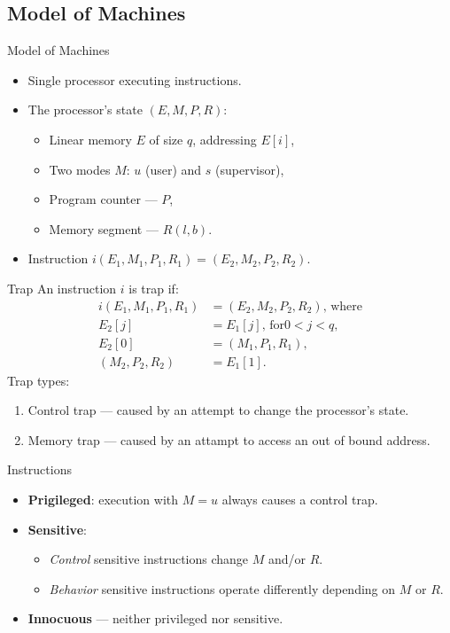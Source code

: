 \subsection{Model of Machines}

\begin{frame}{Model of Machines}
\begin{itemize}
\item Single processor executing instructions.
\item The processor's state $(E, M, P, R)$:
  \begin{itemize}
  \item Linear memory $E$ of size $q$, addressing $E[i]$,
  \item Two modes $M$: $u$ (user) and $s$ (supervisor),
  \item Program counter --- $P$,
  \item Memory segment --- $R (l, b)$.
  \end{itemize}
\item Instruction $i(E_1, M_1, P_1, R_1) = (E_2, M_2, P_2, R_2)$.
\end{itemize}
\end{frame}

\begin{frame}{Trap}
An instruction $i$ is trap if:
\begin{equation*}
  \begin{aligned}
  i(E_1, M_1, P_1, R_1) &= (E_2, M_2, P_2, R_2)\text{, where} \\
  E_2[j] &= E_1[j]\text{, for} 0 < j < q, \\
  E_2[0] &= (M_1, P_1, R_1), \\
  (M_2, P_2, R_2) &= E_1[1].
  \end{aligned}
\end{equation*}
\pause\vfill
Trap types:
\begin{enumerate}
\item Control trap --- caused by an attempt to change the processor's state.
\item Memory trap --- caused by an attampt to access an out of bound address.
\end{enumerate}
\end{frame}

\begin{frame}{Instructions}
\begin{itemize}
\item \textbf{Prigileged}: execution with $M=u$ always causes a
  control trap.\pause
\item \textbf{Sensitive}:
  \begin{itemize}
  \item \textit{Control} sensitive instructions change $M$ and/or $R$.
  \item \textit{Behavior} sensitive instructions operate differently depending
    on $M$ or $R$.\pause
  \end{itemize}
  \item \textbf{Innocuous} --- neither privileged nor sensitive.
\end{itemize}
\end{frame}

